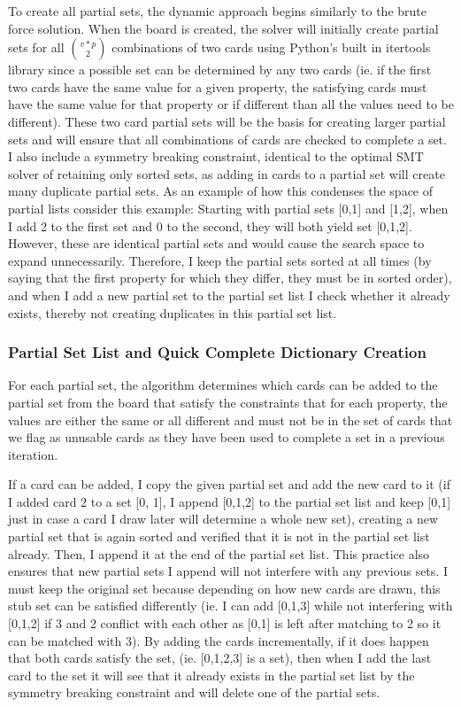 \documentclass[pageno]{jpaper}
\begin{document}
To create all partial sets, the dynamic approach begins similarly to the brute force solution. When the board is created, the solver will initially create partial sets for all ${v*p}\choose{2}$ combinations of two cards using Python's built in itertools library since a possible set can be determined by any two cards (ie. if the first two cards have the same value for a given property, the satisfying cards must have the same value for that property or if different than all the values need to be different). These two card partial sets will be the basis for creating larger partial sets and will ensure that all combinations of cards are checked to complete a set. I also include a symmetry breaking constraint, identical to the optimal SMT solver of retaining only sorted sets, as adding in cards to a partial set will create many duplicate partial sets. As an example of how this condenses the space of partial lists consider this example: Starting with partial sets [0,1] and [1,2], when I add 2 to the first set and 0 to the second, they will both yield set [0,1,2]. However, these are identical partial sets and would cause the search space to expand unnecessarily.  Therefore, I keep the partial sets sorted at all times (by saying that the first property for which they differ, they must be in sorted order), and when I add a new partial set to the partial set list I check whether it already exists, thereby not creating duplicates in this partial set list.

\subsubsection{Partial Set List and Quick Complete Dictionary Creation}

For each partial set, the algorithm determines which cards can be added to the partial set from the board that satisfy the constraints that for each property, the values are either the same or all different and must not be in the set of cards that we flag as unusable cards as they have been used to complete a set in a previous iteration. 

If a card can be added, I copy the given partial set and add the new card to it (if I added card 2 to a set [0, 1], I append [0,1,2] to the partial set list and keep [0,1] just in case a card I draw later will determine a whole new set), creating a  new partial set that is again sorted and verified that it is not in the partial set list already. Then, I append it at the end of the partial set list. This practice also ensures that new partial sets I append will not interfere with any previous sets. I must keep the original set because depending on how new cards are drawn, this stub set can be satisfied differently (ie. I can add [0,1,3] while not interfering with [0,1,2] if 3 and 2 conflict with each other as [0,1] is left after matching to 2 so it can be matched with 3). By adding the cards incrementally, if it does happen that both cards satisfy the set, (ie. [0,1,2,3] is a set), then when I add the last card to the set it will see that it already exists in the partial set list by the symmetry breaking constraint and will delete one of the partial sets.
\end{document}
